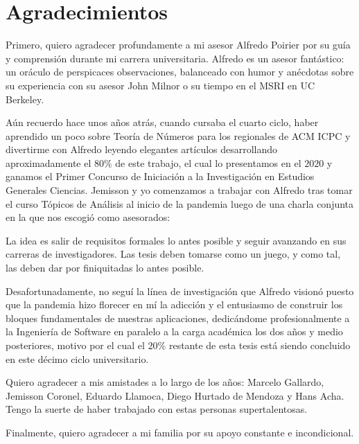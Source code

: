 \chapter*{Agradecimientos}
\thispagestyle{empty}

\vspace{-0.5cm}

Primero, quiero agradecer profundamente a mi asesor Alfredo Poirier
por su guía y comprensión durante mi carrera universitaria.
Alfredo es un asesor fantástico:
un oráculo de perspicaces observaciones,
balanceado con humor
y anécdotas sobre su experiencia
con su asesor John Milnor
o su tiempo en el MSRI en UC Berkeley.

Aún recuerdo hace unos años atrás,
cuando cursaba el cuarto ciclo,
haber aprendido un poco sobre Teoría de Números
para los regionales de ACM ICPC
y divertirme con Alfredo
leyendo elegantes artículos
desarrollando aproximadamente el \(80\%\) de este trabajo,
el cual lo presentamos en el \(2020\)
y ganamos el
Primer Concurso de Iniciación a la Investigación en Estudios Generales Ciencias.
Jemisson y yo comenzamos a trabajar con Alfredo
tras tomar el curso Tópicos de Análisis al inicio de la pandemia
luego de una charla conjunta en la que nos escogió como asesorados:

\begin{displayquote}
La idea es salir de requisitos formales lo antes posible
y seguir avanzando en sus carreras de investigadores.
Las tesis deben tomarse como un juego,
y como tal,
las deben dar por finiquitadas lo antes posible.
\end{displayquote}

Desafortunadamente,
no seguí la línea de investigación
que Alfredo visionó
puesto que la pandemia
hizo florecer en mí
la adicción y el entusiasmo de construir
los bloques fundamentales de nuestras aplicaciones,
dedicándome profesionalmente
a la Ingeniería de Software
en paralelo a la carga académica
los dos años y medio posteriores,
motivo por el cual el \(20\%\) restante de esta tesis
está siendo concluido en este décimo ciclo universitario.

Quiero agradecer a mis amistades a lo largo de los años:
Marcelo Gallardo,
Jemisson Coronel,
Eduardo Llamoca,
Diego Hurtado de Mendoza
y
Hans Acha.
Tengo la suerte de haber trabajado con estas personas supertalentosas.

Finalmente, quiero agradecer a mi familia por su apoyo constante e incondicional.

